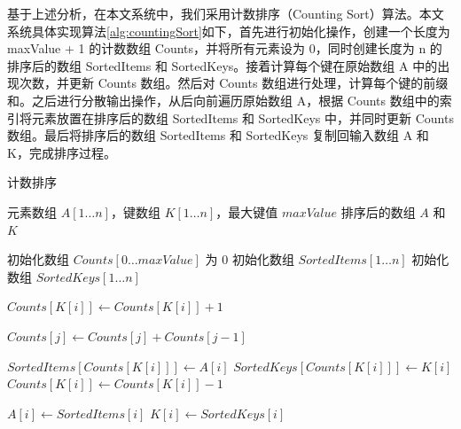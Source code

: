 基于上述分析，在本文系统中，我们采用计数排序（Counting Sort）算法。本文系统具体实现算法\ref{alg:countingSort}如下，首先进行初始化操作，创建一个长度为 maxValue + 1 的计数数组 Counts，并将所有元素设为 0，同时创建长度为 n 的排序后的数组 SortedItems 和 SortedKeys。接着计算每个键在原始数组 A 中的出现次数，并更新 Counts 数组。然后对 Counts 数组进行处理，计算每个键的前缀和。之后进行分散输出操作，从后向前遍历原始数组 A，根据 Counts 数组中的索引将元素放置在排序后的数组 SortedItems 和 SortedKeys 中，并同时更新 Counts 数组。最后将排序后的数组 SortedItems 和 SortedKeys 复制回输入数组 A 和 K，完成排序过程。
\begin{algorithm}
    \caption{计数排序} \label{alg:countingSort}
    \begin{algorithmic}[1]
    \REQUIRE 元素数组 $A[1 \ldots n]$，键数组 $K[1 \ldots n]$，最大键值 $maxValue$
    \ENSURE 排序后的数组 $A$ 和 $K$
    
    \STATE 初始化数组 $Counts[0 \ldots maxValue]$ 为 0
    \STATE 初始化数组 $SortedItems[1 \ldots n]$
    \STATE 初始化数组 $SortedKeys[1 \ldots n]$
    
        \STATE $Counts[K[i]] \leftarrow Counts[K[i]] + 1$
    \ENDFOR
    
        \STATE $Counts[j] \leftarrow Counts[j] + Counts[j-1]$
    \ENDFOR
    
        \STATE $SortedItems[Counts[K[i]]] \leftarrow A[i]$
        \STATE $SortedKeys[Counts[K[i]]] \leftarrow K[i]$
        \STATE $Counts[K[i]] \leftarrow Counts[K[i]] - 1$
    \ENDFOR
    
        \STATE $A[i] \leftarrow SortedItems[i]$
        \STATE $K[i] \leftarrow SortedKeys[i]$
    \ENDFOR
    
    \end{algorithmic}
\end{algorithm}


